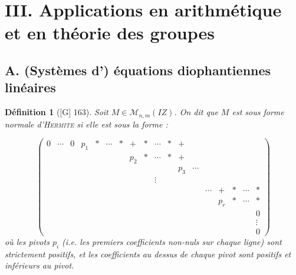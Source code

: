 \documentclass[10pt, a4paper, parskip=full, twoside, twocolumn]{report}
\newtheorem{definition}{Définition}
\newcommand{\M}{\mathcal{M}}
\begin{document}
\section*{III. Applications en arithmétique et en théorie des groupes}
\subsection*{A. (Systèmes d') équations diophantiennes linéaires}

\begin{definition}[\textnormal{[G] 163}]
	Soit $M\in \M_{n,m}(IZ)$. On dit que $M$ est sous \emph{forme normale d'\textsc{Hermite}}
	si elle est sous la forme :

	$$\left(\begin{smallmatrix}
			0 & \cdots & 0 & p_1 & * & \cdots & * & + & * & \cdots & * & + & & & & & & \\
			& & & & & & & p_2 & * & \cdots & * & + & & & & & & \\
			& & & & & & & & & & & p_3 & \cdots & & & & & \\
			& & & & & & & & & \vdots & & & & & & & & \\
			& & & & & & & & & & & & & \cdots & + & * & \cdots & * \\
			& & & & & & & & & & & & & & p_r & * & \cdots & * \\
			& & & & & & & & & & & & & & & & & 0 \\
			& & & & & & & & & & & & & & & & & \vdots \\
			& & & & & & & & & & & & & & & & & 0
		\end{smallmatrix}\right)$$
	où les pivots $p_i$ (\emph{i.e.} les premiers coefficients non-nuls sur chaque ligne) sont strictement positifs, et les coefficients au dessus de 
	chaque pivot sont positifs et inférieurs au pivot.
\end{definition}
\end{document}
